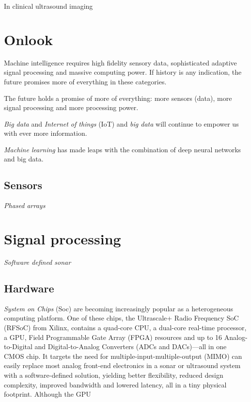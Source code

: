 In clinical ultrasound imaging 

\section{Onlook}


Machine intelligence requires high fidelity sensory data, sophisticated adaptive signal processing and massive computing power. If history is any indication, the future promises more of everything in these categories.

The future holds a promise of more of everything: more sensors (data), more signal processing and more processing power.

\emph{Big data} and \emph{Internet of things} (IoT) and \emph{big data} will continue to empower us with ever more information.  


\emph{Machine learning} has made leaps with the combination of deep neural networks and big data.  


\subsection{Sensors}

\emph{Phased arrays} 

\section{Signal processing}

\emph{Software defined sonar}


\subsection{Hardware}



\emph{System on Chips} (Soc) are becoming increasingly popular as a heterogeneous computing platform. One of these chips, the Ultrascale+ Radio Frequency SoC (RFSoC) from Xilinx, contains a quad-core CPU, a dual-core real-time processor, a GPU, Field Programmable Gate Array (FPGA) resources and up to 16 Analog-to-Digital and Digital-to-Analog Converters (ADCs and DACs)---all in one CMOS chip. It targets the need for multiple-input-multiple-output (MIMO) can easily replace most analog front-end electronics in a sonar or ultrasound system with a software-defined solution, yielding better flexibility, reduced design complexity, improved bandwidth and lowered latency, all in a tiny physical footprint. Although the GPU

